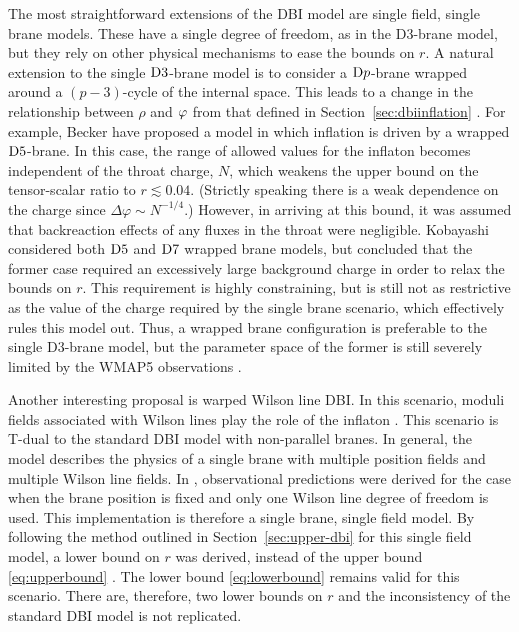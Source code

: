 The most straightforward extensions of the DBI model are single field, single brane
models. 
These have a single degree of freedom, as in the D3-brane model, but
they rely on other physical mechanisms to ease the bounds on $r$.
A natural extension to the single ${\rm D3}$-brane model 
is to consider a ${\rm D}p$-brane wrapped around a $(p-3)$-cycle of the 
internal space.
This leads to a change in the relationship
between $\rho$ and $\varphi$ from that defined in Section~\ref{sec:dbiinflation}
\cite{Kobayashi:2007hm, Becker:2007ui, Ward:2007gs}.  
For example, Becker \etal \cite{Becker:2007ui} 
have proposed a model in which inflation is driven by a wrapped ${\rm D5}$-brane. 
In this case, the range of allowed values for the inflaton 
becomes independent of the throat charge, $N$, which weakens the upper bound on 
the tensor-scalar ratio to $r \lesssim 0.04$. (Strictly speaking there is a weak
dependence on the charge since $\Delta \varphi \sim N^{-1/4}$.)
However, in arriving at this bound, it was assumed that 
backreaction effects of any fluxes in the throat were 
negligible. 
Kobayashi \etal \cite{Kobayashi:2007hm} 
considered both ${\rm D5}$ and
${\rm D7}$ wrapped brane models, but concluded that the former case
required an excessively large background charge in 
order to relax the bounds on $r$. 
% 
This requirement is highly constraining, but is
still not as restrictive as the value of the charge required by the single brane scenario,
which effectively rules this model out. 
% 
Thus, a wrapped brane configuration is preferable to
the single D3-brane model, but the parameter space of the former is still severely
limited by the WMAP5 observations \cite{Alabidi:2008ej}. 


Another interesting proposal is warped Wilson line DBI. In this scenario, moduli
fields associated with Wilson
lines play the role of the inflaton \cite{Avgoustidis:2008zu}. This scenario is
T-dual to the
standard DBI model with non-parallel branes. In general, the model describes the
physics of a single brane with multiple position fields and multiple Wilson line
fields.
% 
In , observational predictions were derived for
the case when the brane position is fixed and only one Wilson line degree of freedom
is used. This implementation is therefore a single brane, single field model.
% 
By following the method outlined in Section~\ref{sec:upper-dbi} for this single field model,
a lower bound on $r$ was derived, instead of the upper bound \eqref{eq:upperbound}
\cite{Avgoustidis:2008zu}. The lower bound \eqref{eq:lowerbound} remains valid for
this scenario. 
% 
There are, therefore, two lower bounds on $r$ and the inconsistency of the
standard DBI model is not replicated. 
 


